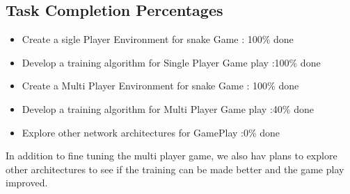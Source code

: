 \documentclass[conference,10pt]{IEEEtran}
\begin{document}
\subsection{Task Completion Percentages}
\begin{itemize}
\item{Create a sigle Player Environment for snake Game} : 100\%	done
\item{Develop a training algorithm for Single Player Game play} :100\% done
\item{Create a Multi Player Environment for snake Game} : 100\%	done
\item{Develop a training algorithm for Multi Player Game play} :40\% done
\item{Explore other network architectures for GamePlay} :0\% done
\end{itemize}

\break
\break
In addition to fine tuning the multi player game, we also hav plans to explore other architectures to see if the training can be made better and the game play improved.
\break
\break
\end{document}
